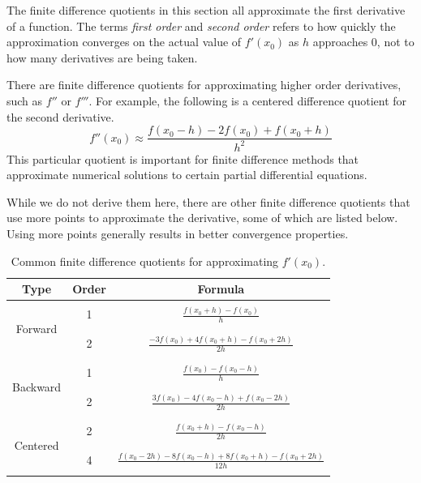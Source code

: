 \begin{info}
The finite difference quotients in this section all approximate the first derivative of a function.
The terms \emph{first order} and \emph{second order} refers to how quickly the approximation converges on the actual value of $f'(x_0)$ as $h$ approaches $0$, not to how many derivatives are being taken.

There are finite difference quotients for approximating higher order derivatives, such as $f''$ or $f'''$.
For example, the following is a centered difference quotient for the second derivative.
\[
f''(x_0) \approx \frac{f(x_0-h) - 2f(x_0) + f(x_0+h)}{h^2}
\]
This particular quotient is important for finite difference methods that approximate numerical solutions to certain partial differential equations.
\end{info}


While we do not derive them here, there are other finite difference quotients that use more points to approximate the derivative, some of which are listed below.
Using more points generally results in better convergence properties.

\begin{table}[H]
\centering
\begin{tabular}{|c|c|c|}
\hline
Type & Order & Formula \\
\hline \multirow{6}{*}{Forward} & & \\
    & 1 & \Large{$\frac{f(x_0+h) - f(x_0)}{h}$} \\
    & & \\
    \cline{2-3} & & \\
    & 2 & \Large{$\frac{-3f(x_0) + 4f(x_0+h) - f(x_0+2h)}{2h}$} \\
    & & \\
\hline \multirow{6}{*}{Backward} & & \\
    & 1 & \Large{$\frac{f(x_0) - f(x_0-h)}{h}$} \\
    & & \\
    \cline{2-3} & & \\
    & 2 & \Large{$\frac{3f(x_0) - 4f(x_0-h) + f(x_0-2h)}{2h}$} \\
    & & \\
\hline \multirow{6}{*}{Centered} & & \\
    & 2 & \Large{$\frac{f(x_0+h) - f(x_0-h)}{2h}$} \\
    & & \\
    \cline{2-3} & & \\
    & 4 & \Large{$\frac{f(x_0-2h) - 8f(x_0-h) + 8f(x_0+h) -f(x_0+2h)}{12h}$} \\
    & & \\
\hline
\end{tabular}
\caption{Common finite difference quotients for approximating $f'(x_0)$.}
\label{table:finite-difference-quotients}
\end{table}

